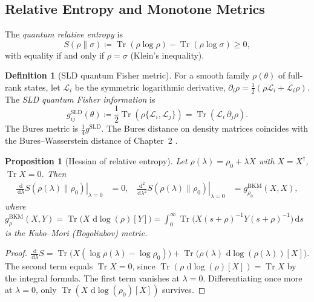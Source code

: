 \documentclass[11pt,a4paper,reqno]{amsart}
\newtheorem{proposition}[theorem]{Proposition}
\theoremstyle{definition}
\newtheorem{definition}[theorem]{Definition}
\numberwithin{equation}{section}
\newcommand{\Tr}{\operatorname{Tr}}
\newcommand{\dif}{\,\mathrm{d}}
\begin{document}
\subsection{Relative Entropy and Monotone Metrics}
The \emph{quantum relative entropy} is
\begin{equation}
    \label{eq:relative_entropy}
    S(\rho \| \sigma) \coloneqq \Tr(\rho \log \rho) - \Tr(\rho \log \sigma) \ge 0,
\end{equation}
with equality if and only if $\rho = \sigma$ (Klein's inequality).

\begin{definition}[SLD quantum Fisher metric]
For a smooth family $\rho(\theta)$ of full-rank states, let $\mathcal{L}_i$ be the symmetric logarithmic derivative, $\partial_i \rho = \frac{1}{2}(\rho \mathcal{L}_i + \mathcal{L}_i \rho)$. The \emph{SLD quantum Fisher information} is
\begin{equation}
    \label{eq:qfi_metric}
    g_{ij}^{\mathrm{SLD}}(\theta) \coloneqq \frac{1}{2} \Tr\left( \rho \{ \mathcal{L}_i, \mathcal{L}_j \} \right) = \Tr\left( \mathcal{L}_i\, \partial_j \rho \right).
\end{equation}
The Bures metric is $\frac14 g^{\mathrm{SLD}}$. The Bures distance on density matrices coincides with the Bures--Wasserstein distance of Chapter~2 \cite{silvafilho2026flows}.
\end{definition}

\begin{proposition}[Hessian of relative entropy]
\label{prop:relative_entropy_hessian}
Let $\rho(\lambda) = \rho_0 + \lambda X$ with $X = X^\dagger$, $\Tr X = 0$. Then
\begin{align}
    \left. \frac{\dif}{\dif \lambda} S(\rho(\lambda) \| \rho_0) \right|_{\lambda=0} &= 0, &
    \left. \frac{\dif^2}{\dif \lambda^2} S(\rho(\lambda) \| \rho_0) \right|_{\lambda=0} &= g^{\mathrm{BKM}}_{\rho_0}(X, X),
\end{align}
where $g^{\mathrm{BKM}}_{\rho}(X,Y) = \Tr\big(X\, \dif\log(\rho)[Y]\big) = \int_0^\infty \Tr\big(X (s+\rho)^{-1} Y (s+\rho)^{-1}\big)\dif s$ is the Kubo--Mori (Bogoliubov) metric.
\end{proposition}
\begin{proof}
$\frac{\dif}{\dif\lambda}S = \Tr\big(X(\log\rho(\lambda) - \log\rho_0)\big) + \Tr\big(\rho(\lambda)\,\dif\log(\rho(\lambda))[X]\big)$. The second term equals $\Tr X = 0$, since $\Tr(\rho\,\dif\log(\rho)[X]) = \Tr X$ by the integral formula. The first term vanishes at $\lambda = 0$. Differentiating once more at $\lambda = 0$, only $\Tr(X\,\dif\log(\rho_0)[X])$ survives.
\end{proof}
\end{document}
